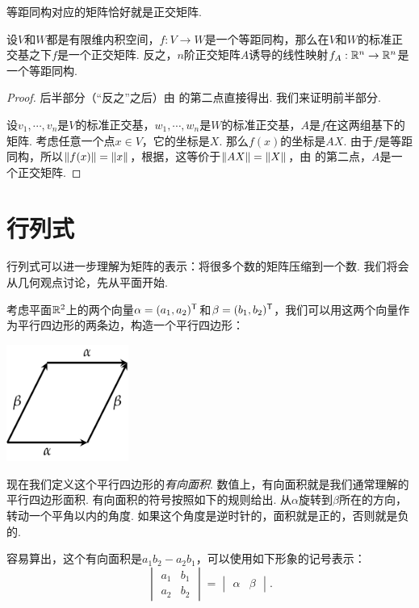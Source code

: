 等距同构对应的矩阵恰好就是正交矩阵. 
\begin{theorem}\label{thm:isometry-matrix}
设$V$和$W$都是有限维内积空间，$f:V\to W$是一个等距同构，那么在$V$和$W$的标准正交基之下$f$是一个正交矩阵. 反之，$n$阶正交矩阵$A$诱导的线性映射$f_A:\mathbb{R}^n\to\mathbb{R}^n$是一个等距同构. 
\end{theorem}
\begin{proof}
    后半部分（“反之”之后）由 的第二点直接得出. 我们来证明前半部分. 
    
    设$v_1,\cdots,v_n$是$V$的标准正交基，$w_1,\cdots,w_n$是$W$的标准正交基，$A$是$f$在这两组基下的矩阵. 考虑任意一个点$x\in V$，它的坐标是$X$. 那么$f(x)$的坐标是$AX$. 由于$f$是等距同构，所以$\left\|f(x)\right\|=\left\|x\right\|$，根据，这等价于$\left\|AX\right\|=\left\|X\right\|$，由 的第二点，$A$是一个正交矩阵. 
\end{proof}

\section{行列式}\label{sec:determinant}

行列式可以进一步理解为矩阵的表示：将很多个数的矩阵压缩到一个数. 我们将会从几何观点讨论，先从平面开始.  

考虑平面$\mathbb{R}^2$上的两个向量$\alpha=(a_1,a_2)^{\mathsf{T}}$和$\beta=(b_1,b_2)^{\mathsf{T}}$，我们可以用这两个向量作为平行四边形的两条边，构造一个平行四边形：
\begin{center}
\includegraphics[width=0.3\textwidth]{figures/linear-algebra/parallelogram.pdf}
\end{center}

现在我们定义这个平行四边形的\emph{有向面积}. 数值上，有向面积就是我们通常理解的平行四边形面积. 有向面积的符号按照如下的规则给出. 从$\alpha$旋转到$\beta$所在的方向，转动一个平角以内的角度. 如果这个角度是逆时针的，面积就是正的，否则就是负的. 

容易算出，这个有向面积是$a_1b_2-a_2b_1$，可以使用如下形象的记号表示：
\[\begin{vmatrix}
    a_1 & b_1 \\
    a_2 & b_2
\end{vmatrix}=
\begin{vmatrix}
    \alpha & \beta
\end{vmatrix}.\]


